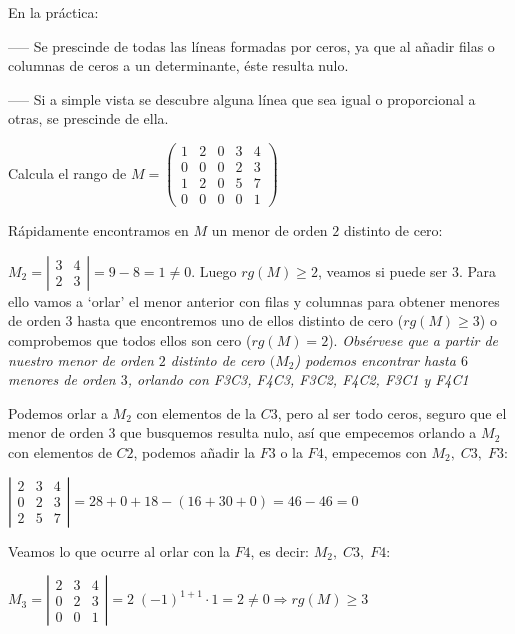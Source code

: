 En la práctica:

----- Se prescinde de todas las líneas formadas por ceros, ya que al añadir filas o columnas de ceros a un determinante, éste resulta nulo.

----- Si a simple vista se descubre alguna línea que sea igual o proporcional a otras, se prescinde de ella.


\begin{ejem} Calcula el rango de  $M	= \left( \begin{matrix} 1&2&0&3&4\\0&0&0&2&3\\1&2&0&5&7\\0&0&0&0&1  \end{matrix} \right)$

Rápidamente encontramos en $M$ un menor de orden $2$ distinto de cero:



$M_2=\left| \begin{matrix} 3&4\\2&3  \end{matrix} \right|=9-8=1\neq 0$. Luego $rg(M)\ge 2$, veamos si puede ser $3$. Para ello vamos a `orlar' el menor anterior con filas y columnas para obtener menores de orden $3$ hasta que encontremos uno de ellos distinto de cero ($rg(M)\ge 3$) o comprobemos que todos ellos son cero ($rg(M)=2$). \textcolor{gris}{\emph{Obsérvese que a partir de nuestro menor de orden $2$ distinto de cero $(M_2$) podemos encontrar hasta $6$ menores de orden $3$, orlando con F3C3, F4C3, F3C2, F4C2, F3C1 y F4C1}}

Podemos orlar a $M_2$ con elementos de la $C3$, pero al ser todo ceros, seguro que el menor de orden $3$ que busquemos resulta nulo, así que empecemos orlando a $M_2$ con elementos de $C2$, podemos añadir la $F3$ o la $F4$, empecemos con $M_2,\; C3,\; F3$:

$\left| \begin{matrix} 2 & \boxed{3} & \boxed{4} \\ 0 & \boxed{2} & \boxed{3} \\ 2 & 5 & 7  \end{matrix} \right| = 28+0+18-(16+30+0)=46-46=0$

Veamos lo que ocurre al orlar con la $F4$, es decir:  $M_2,\; C3,\; F4$:

$M_3=\left| \begin{matrix} 2 & \boxed{3} & \boxed{4} \\ 0 & \boxed{2} & \boxed{3} \\ 0 & 0 & 1  \end{matrix} \right| = 2\; (-1)^{1+1}\cdot 1=2\neq 0 \Rightarrow  rg(M)\ge 3$


\end{ejem}

